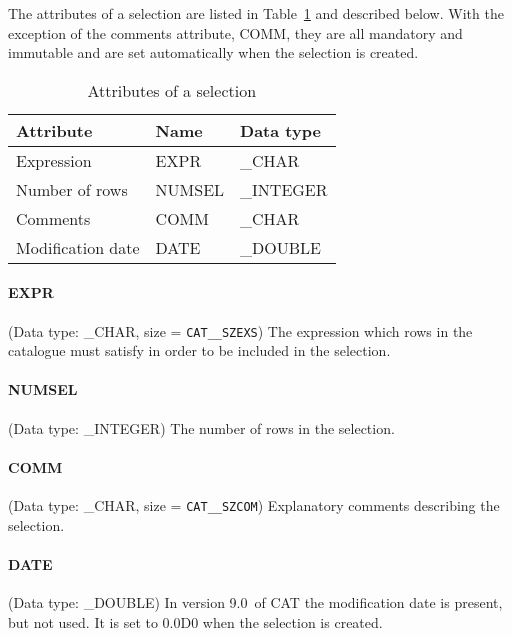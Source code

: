 \documentclass[11pt,twoside]{starlink}
\providecommand{\CATversion}{9.0~}
\begin{document}
The attributes of a selection are listed in Table~\ref{SELECT_ATT}
and described below. With the exception of the comments attribute,
COMM, they are all mandatory and immutable and are set automatically
when the selection is created.

\begin{table}[htbp]

\begin{center}
\begin{tabular}{lll}
Attribute         & Name    & Data type  \\ \hline
Expression        & EXPR    & \_CHAR     \\
Number of rows    & NUMSEL  & \_INTEGER  \\
Comments          & COMM    & \_CHAR     \\
Modification date & DATE    & \_DOUBLE   \\
\end{tabular}
\end{center}

\caption{\label{SELECT_ATT}Attributes of a selection}

\end{table}

\paragraph{EXPR}
(Data type: \_CHAR, size = \texttt{CAT\_\_SZEXS})
The expression which rows in the catalogue must satisfy in order to be
included in the selection.

\paragraph{NUMSEL}
(Data type: \_INTEGER)
The number of rows in the selection.

\paragraph{COMM}
(Data type: \_CHAR, size = \texttt{CAT\_\_SZCOM})
Explanatory comments describing the selection.

\paragraph{DATE}
(Data type: \_DOUBLE)
In version \CATversion of CAT the modification date is present, but
not used. It is set to 0.0D0 when the selection is created.
\end{document}
